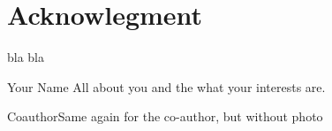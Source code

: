 \documentclass[twocolumn,english]{IEEEtran}
\theoremstyle{plain}
\theoremstyle{plain}
\begin{document}
\section*{Acknowlegment}

bla bla




\begin{IEEEbiography}
{Your Name} All about you and the what your interests are.
\end{IEEEbiography}

\begin{IEEEbiographynophoto}
{Coauthor}Same again for the co-author, but without photo\end{IEEEbiographynophoto}
\end{document}
